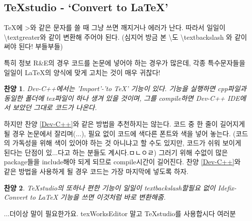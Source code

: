 \documentclass[11pt]{article}
\newtheorem{praise}{찬양}
\begin{document}
\subsection{TeXstudio - \textquoteleft Convert to LaTeX\textquoteright}
TeX에 \textgreater 와 같은 문자를 쓸 때 그냥 쓰면 깨지거나 에러가 난다. 따라서 일일이 \textbackslash textgreater와 같이 변환해 주어야 된다. (심지어 방금 본 \textbackslash 도 \textbackslash textbackslash 와 같이 써야 된다! 부들부들)

특히 정보 R\&E의 경우 코드를 논문에 넣어야 하는 경우가 많은데, 각종 특수문자들을 일일이 LaTeX의 양식에 맞게 고치는 것이 매우 귀찮다!

\begin{praise}
	Dev-C++에서는 'Import'-'to TeX' 기능이 있다. 기능을 실행하면 cpp파일과 동일한 폴더에 tex파일이 하나 생겨 있을 것이며, 그를 compile하면 Dev-C++ IDE에서 보았던 그대로 코드가 나온다.
\end{praise} \label{Dev-C++}

하지만 찬양 \ref{Dev-C++}와 같은 방법을 추천하지는 않는다. 코드 중 한 줄이 길어지게 될 경우 논문에서 잘리며(...), 필요 없이 코드에 색다른 폰트와 색을 넣어 놓는다. (코드의 가독성을 위해 색이 있어야 하는 것 아니냐고 할 수도 있지만, 코드가 쉬워 보이게 된다는 단점이 있...다고 하는 분들도 계시다.ㅁㄴㅇㄹ) 그러기 위해 수없이 많은 package들을 include해야 되게 되므로 compile시간이 길어진다. 찬양 \ref{Dev-C++}와 같은 방법을 사용하게 될 경우 코드는 가장 마지막에 넣도록 하자.

\begin{praise}
	TeXstudio의 또하나 편한 기능이 일일이 textbackslash할필요 없이 Idefix-Convert to LaTeX 기능을 쓰면 이것처럼 바로 변환해줌.
\end{praise}
...더이상 말이 필요한가요. texWorksEditor 말고 TeXstudio를 사용합시다 여러분




\end{document}
